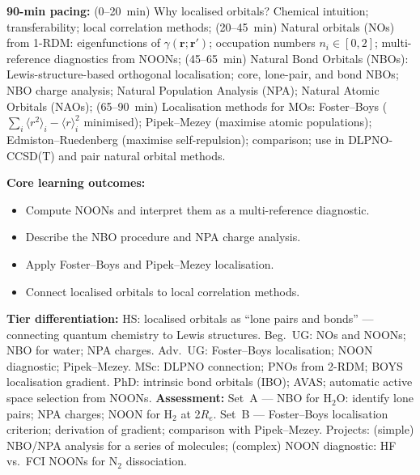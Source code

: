 \documentclass[11pt,a4paper]{article}
\begin{document}
\begin{tcolorbox}[chembox, title={Module~III.2 / L12: Natural and Localised Orbitals}]
\textbf{90-min pacing:} (0--20~min) Why localised orbitals? Chemical intuition; transferability; local correlation methods; (20--45~min) Natural orbitals (NOs) from 1-RDM: eigenfunctions of $\gamma(\mathbf{r};\mathbf{r}')$; occupation numbers $n_i\in[0,2]$; multi-reference diagnostics from NOONs; (45--65~min) Natural Bond Orbitals (NBOs): Lewis-structure-based orthogonal localisation; core, lone-pair, and bond NBOs; NBO charge analysis; Natural Population Analysis (NPA); Natural Atomic Orbitals (NAOs); (65--90~min) Localisation methods for MOs: Foster--Boys ($\sum_i\langle r^2\rangle_i - \langle r\rangle_i^2$ minimised); Pipek--Mezey (maximise atomic populations); Edmiston--Ruedenberg (maximise self-repulsion); comparison; use in DLPNO-CCSD(T) and pair natural orbital methods.

\medskip\textbf{Core learning outcomes:}
\begin{itemize}[leftmargin=1.4em,topsep=2pt,itemsep=1pt]
  \item Compute NOONs and interpret them as a multi-reference diagnostic.
  \item Describe the NBO procedure and NPA charge analysis.
  \item Apply Foster--Boys and Pipek--Mezey localisation.
  \item Connect localised orbitals to local correlation methods.
\end{itemize}
\medskip\textbf{Tier differentiation:}
HS: localised orbitals as ``lone pairs and bonds'' --- connecting quantum chemistry to Lewis structures.
Beg.\ UG: NOs and NOONs; NBO for water; NPA charges.
Adv.\ UG: Foster--Boys localisation; NOON diagnostic; Pipek--Mezey.
MSc: DLPNO connection; PNOs from 2-RDM; BOYS localisation gradient.
PhD: intrinsic bond orbitals (IBO); AVAS; automatic active space selection from NOONs.
\medskip\textbf{Assessment:}
Set~A --- NBO for H$_2$O: identify lone pairs; NPA charges; NOON for H$_2$ at 2$R_e$.
Set~B --- Foster--Boys localisation criterion; derivation of gradient; comparison with Pipek--Mezey.
Projects: (simple) NBO/NPA analysis for a series of molecules; (complex) NOON diagnostic: HF vs.\ FCI NOONs for N$_2$ dissociation.
\end{tcolorbox}

\medskip
\end{document}
